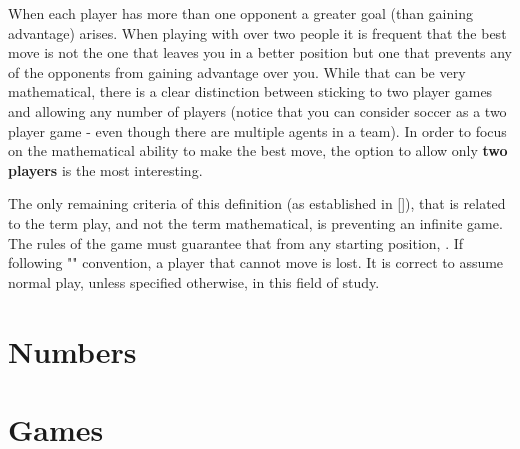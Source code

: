 When each player has more than one opponent a greater goal (than gaining advantage) arises. When playing with over two people it is frequent that the best move is not the one that leaves you in a better position but one that prevents any of the opponents from gaining advantage over you. While that can be very mathematical, there is a clear distinction between sticking to two player games and allowing any number of players (notice that you can consider soccer as a two player game - even though there are multiple agents in a team). In order to focus on the mathematical ability to make the best move, the option to allow only \textbf{two players} is the most interesting.

The only remaining criteria of this definition (as established in []), that is related to the term play, and not the term mathematical, is preventing an infinite game. The rules of the game must guarantee that from any starting position, . If following "" convention, a player that cannot move is lost. It is  correct to assume normal play, unless specified otherwise, in this field of study.



\section {Numbers}
\section {Games}
